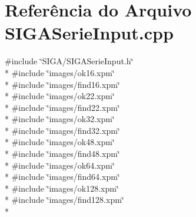 \section{Referência do Arquivo S\+I\+G\+A\+Serie\+Input.\+cpp}
\label{_s_i_g_a_serie_input_8cpp}
{\ttfamily \#include \char`\"{}S\+I\+G\+A/\+S\+I\+G\+A\+Serie\+Input.\+h\char`\"{}}\\*
{\ttfamily \#include \char`\"{}images/ok16.\+xpm\char`\"{}}\\*
{\ttfamily \#include \char`\"{}images/find16.\+xpm\char`\"{}}\\*
{\ttfamily \#include \char`\"{}images/ok22.\+xpm\char`\"{}}\\*
{\ttfamily \#include \char`\"{}images/find22.\+xpm\char`\"{}}\\*
{\ttfamily \#include \char`\"{}images/ok32.\+xpm\char`\"{}}\\*
{\ttfamily \#include \char`\"{}images/find32.\+xpm\char`\"{}}\\*
{\ttfamily \#include \char`\"{}images/ok48.\+xpm\char`\"{}}\\*
{\ttfamily \#include \char`\"{}images/find48.\+xpm\char`\"{}}\\*
{\ttfamily \#include \char`\"{}images/ok64.\+xpm\char`\"{}}\\*
{\ttfamily \#include \char`\"{}images/find64.\+xpm\char`\"{}}\\*
{\ttfamily \#include \char`\"{}images/ok128.\+xpm\char`\"{}}\\*
{\ttfamily \#include \char`\"{}images/find128.\+xpm\char`\"{}}\\*
